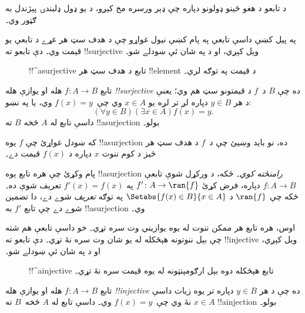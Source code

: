 \documentclass[../../../include/open-logic-section]{subfiles}
\begin{document}

\begin{explain}
د تابعو د هغو ځينو ډولونو دپاره چې ډېر ورسره مخ کېږو، د يو ډول
ډلبندۍ پېژندل به ګټور وي۔

په پيل کښې داسې تابعې په پام کښې نيول غواړو چې د هدف سټ هر
غړے د تابعې يو قيمت وي۔ دې تابعو ته !!{surjective} ويل کېږي،
او د  په شان ئې ښودلے شو۔

\begin{figure}
  \caption{!!^a{surjective} تابع د هدف سټ هر !!{element} د قيمت په توګه لري۔}
\end{figure}
\end{explain}

\begin{defn}
تابع $f \colon A \rightarrow B$ هله او يوازې هله \emph{!!{surjective}}
ده چې $B$ د~$f$ د قيمتونو سټ هم وي؛ يعنې د هر $y \in B$
دپاره لږ تر لږه يو $x \in A$ وي چې~$f(x) = y$ وي، يا په نښو:
\[
  (\forall y \in B)(\exists x \in A)f(x) = y.
\]
داسې تابع له $A$ څخه $B$ ته !!a{surjection} بولو۔
\end{defn}

\begin{explain}
که ښودل غواړئ چې $f$ يوه !!a{surjection} ده، نو بايد وښيئ چې د~$f$
د هدف سټ هر څيز د کوم ننوت $x$ دپاره د $f(x)$ قيمت دے۔

پام وکړئ چې هره تابع يوه !!a{surjection} \emph{رامنځته کوي}۔ ځکه،
د ورکړل شوې تابعې $f \colon A \to B$ دپاره، فرض کړئ
$f' \colon A \to \ran{f}$ په $f'(x) = f(x)$ تعريف شوې ده۔ ځکه
چې $\ran{f}$ د $\Setabs{f(x) \in B}{x \in A}$ په توګه \emph{تعريف}
شوے دے، دا تضمين شوے دے چې تابع $f'$ به !!a{surjection} وي۔
\end{explain}

\begin{explain}
اوس، هره تابع هر ممکن ننوت له يوه يوازيني وت سره تړي۔ خو داسې
تابعې هم شته چې بېل ننوتونه هېڅکله له يو شان وت سره نۀ تړي۔ دې
تابعو ته !!{injective} ويل کېږي، او د  په شان
ئې ښودلے شو۔
\begin{figure}
  \caption{!!^a{injective} تابع هېڅکله دوه بېل ارګومېنټونه له يوه قيمت سره نۀ تړي۔}
\end{figure}
\end{explain}

\begin{defn}
تابع $f \colon A \rightarrow B$ هله او يوازې هله \emph{!!{injective}}
ده چې د هر $y \in B$ دپاره تر يوه زيات داسې $x \in A$ نۀ وي
چې~$f(x) = y$ وي۔ داسې تابع له $A$ څخه~$B$ ته !!a{injection} بولو۔
\end{defn}
\end{document}
